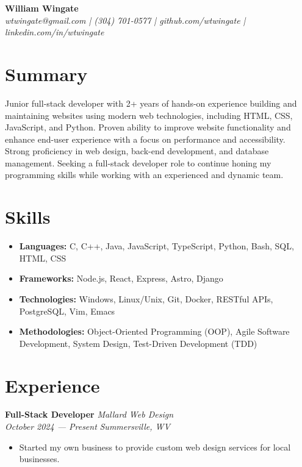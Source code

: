 \documentclass[letterpaper, 11pt]{article}
\begin{document}
\thispagestyle{empty}


\begin{center}
  {\LARGE \textbf{William Wingate}} \\
  \vspace{10pt}
  \textit{wtwingate@gmail.com | (304) 701-0577 | github.com/wtwingate
    | linkedin.com/in/wtwingate}
\end{center}


\section*{Summary}
Junior full-stack developer with 2+ years of hands-on experience
building and maintaining websites using modern web technologies,
including HTML, CSS, JavaScript, and Python.  Proven ability to
improve website functionality and enhance end-user experience with a
focus on performance and accessibility.  Strong proficiency in web
design, back-end development, and database management.  Seeking a
full-stack developer role to continue honing my programming skills
while working with an experienced and dynamic team.


\section*{Skills}
\begin{itemize}
\item \textbf{Languages:} C, C++, Java, JavaScript, TypeScript,
  Python, Bash, SQL, HTML, CSS
\item \textbf{Frameworks:} Node.js, React, Express, Astro, Django
\item \textbf{Technologies:} Windows, Linux/Unix, Git, Docker, RESTful
  APIs, PostgreSQL, Vim, Emacs
\item \textbf{Methodologies:} Object-Oriented Programming (OOP), Agile
  Software Development, System Design, Test-Driven Development (TDD)
\end{itemize}


\section*{Experience}
\textbf{Full-Stack Developer}
\hfill \textit{Mallard Web Design} \\
\textit{October 2024 — Present}
\hfill \textit{Summersville, WV}
\begin{itemize}
\item Started my own business to provide custom web design services
  for local businesses.
\end{itemize}
\end{document}
